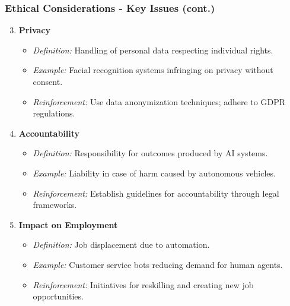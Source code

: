 \documentclass[aspectratio=169]{beamer}
\begin{document}
\begin{frame}[fragile]
    \frametitle{Ethical Considerations - Key Issues (cont.)}
    \begin{enumerate}
        \setcounter{enumi}{2} %
        \item \textbf{Privacy}
        \begin{itemize}
            \item \textit{Definition:} Handling of personal data respecting individual rights.
            \item \textit{Example:} Facial recognition systems infringing on privacy without consent.
            \item \textit{Reinforcement:} Use data anonymization techniques; adhere to GDPR regulations.
        \end{itemize}

        \item \textbf{Accountability}
        \begin{itemize}
            \item \textit{Definition:} Responsibility for outcomes produced by AI systems.
            \item \textit{Example:} Liability in case of harm caused by autonomous vehicles.
            \item \textit{Reinforcement:} Establish guidelines for accountability through legal frameworks.
        \end{itemize}

        \item \textbf{Impact on Employment}
        \begin{itemize}
            \item \textit{Definition:} Job displacement due to automation.
            \item \textit{Example:} Customer service bots reducing demand for human agents.
            \item \textit{Reinforcement:} Initiatives for reskilling and creating new job opportunities.
        \end{itemize}
    \end{enumerate}
\end{frame}
\end{document}
